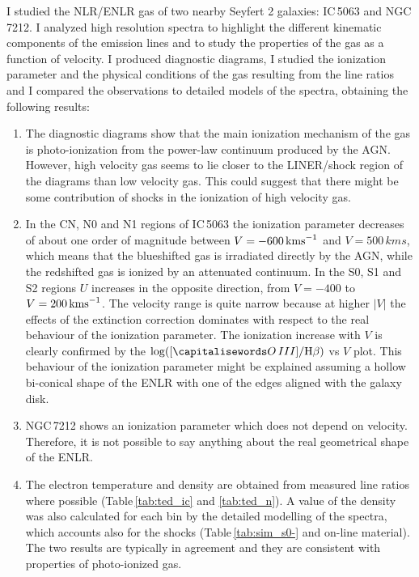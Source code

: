 \documentclass[../main.tex]{subfiles}
\begin{document}
I studied the NLR/ENLR gas of two nearby Seyfert 2 galaxies: IC\,5063 and NGC\,7212.
I analyzed high resolution spectra to highlight the different kinematic components of the emission lines and to study the properties of the gas as a function of velocity.
I produced diagnostic diagrams, I studied the ionization parameter and the physical conditions
of the gas resulting from the line ratios and I compared the observations to detailed models of the spectra, obtaining the following results: 

\begin{enumerate}
\item The diagnostic diagrams show that the main ionization mechanism of the gas is photo-ionization from the power-law continuum produced by the AGN.
However, high velocity gas seems to lie closer to the LINER/shock region of the diagrams than low velocity gas. 
This could suggest that there might be some contribution of shocks in the ionization of high velocity gas.

\item In the CN, N0 and N1 regions of IC\,5063 the ionization parameter decreases of about one order of magnitude between $V=-600\,\si{\kms}$ and $V=500\,\si{kms}$, which means that the blueshifted gas is irradiated directly by the AGN, while the redshifted gas is ionized by an attenuated continuum.
In the S0, S1 and S2 regions $U$ increases in the opposite direction, from $V=-400$ to $V=200\,\si{\kms}$.
The velocity range is quite narrow because at higher $\lvert V \rvert$ the effects of the extinction correction dominates with respect to the real behaviour of the ionization parameter.
The ionization increase with $V$ is clearly confirmed by the $\log([\ion{O}{III}]/\Hb)$ vs $V$ plot.
This behaviour of the ionization parameter might be explained assuming a hollow bi-conical shape of the ENLR with one of the edges aligned with the galaxy disk.

\item NGC\,7212 shows an ionization parameter which does not depend on velocity.
Therefore, it is not possible to say anything about the real geometrical shape of the ENLR.

\item The electron temperature and density are obtained from measured line ratios where possible (Table\,\ref{tab:ted_ic} and \ref{tab:ted_n}).
A value of the density was also calculated for each bin by the detailed modelling of the spectra, which accounts also for the shocks (Table\,\ref{tab:sim_s0-} and on-line material).
The two results are typically in agreement and they are consistent with properties of photo-ionized gas.


\end{enumerate}
\end{document}
